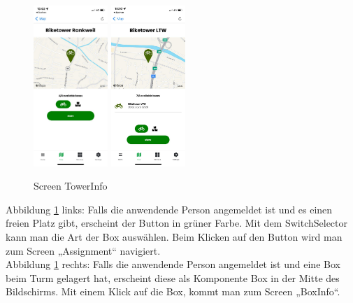 \begin{figure}[H]
  \centering
  \includegraphics[width=0.25\textwidth]{images/app-screenshots/screentowerinfoc.png}
  \includegraphics[width=0.25\textwidth]{images/app-screenshots/screentowerinfod.png}
  \caption{Screen TowerInfo}
  \label{fig:screentowerinfo}
\end{figure}
Abbildung \ref{fig:screentowerinfo} links: Falls die anwendende Person angemeldet ist und es einen freien Platz gibt, erscheint der Button in grüner Farbe. Mit dem SwitchSelector kann man die Art der Box auswählen. Beim Klicken auf den Button wird man zum Screen „Assignment“ navigiert.\\
Abbildung \ref{fig:screentowerinfo} rechts: Falls die anwendende Person angemeldet ist und eine Box beim Turm gelagert hat, erscheint diese als Komponente Box in der Mitte des Bildschirms. Mit einem Klick auf die Box, kommt man zum Screen „BoxInfo“.